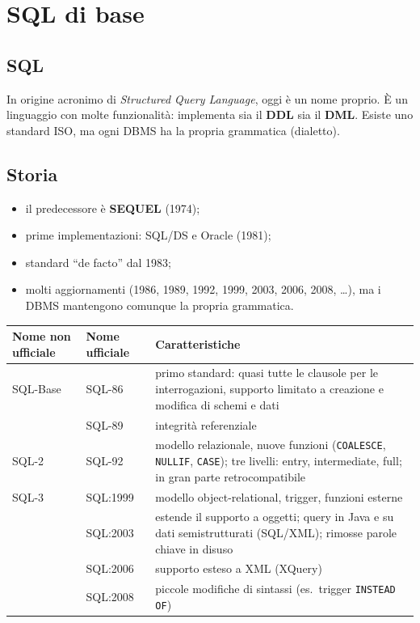 \documentclass[a4paper,12pt]{article}
\begin{document}
\section{SQL di base}

\subsection{SQL}

In origine acronimo di \emph{Structured Query Language}, oggi è un nome
proprio. È un linguaggio con molte funzionalità: implementa sia il \textbf{DDL}
sia il \textbf{DML}. Esiste uno standard ISO, ma ogni DBMS ha la propria
grammatica (dialetto).

\subsection{Storia}

\begin{itemize}
  \item il predecessore è \textbf{SEQUEL} (1974);
  \item prime implementazioni: SQL/DS e Oracle (1981);
  \item standard ``de facto'' dal 1983;
  \item molti aggiornamenti (1986, 1989, 1992, 1999, 2003, 2006, 2008, \dots),
    ma i DBMS mantengono comunque la propria grammatica.
\end{itemize}

\begin{center}
\begin{tabular}{|l|l|p{8cm}|}
\hline
\textbf{Nome non ufficiale} & \textbf{Nome ufficiale} & \textbf{Caratteristiche}\\ \hline
SQL-Base & SQL-86 & primo standard: quasi tutte le clausole per le
  interrogazioni, supporto limitato a creazione e modifica di schemi e dati\\
         & SQL-89 & integrità referenziale\\ \hline
SQL-2 & SQL-92 & modello relazionale, nuove funzioni (\texttt{COALESCE},
  \texttt{NULLIF}, \texttt{CASE}); tre livelli: entry, intermediate, full;
  in gran parte retrocompatibile\\ \hline
SQL-3 & SQL:1999 & modello object-relational, trigger, funzioni esterne\\
      & SQL:2003 & estende il supporto a oggetti; query in Java e su dati
  semistrutturati (SQL/XML); rimosse parole chiave in disuso\\
      & SQL:2006 & supporto esteso a XML (XQuery)\\
      & SQL:2008 & piccole modifiche di sintassi (es.\ trigger
  \texttt{INSTEAD OF})\\ \hline
\end{tabular}
\end{center}
\end{document}
